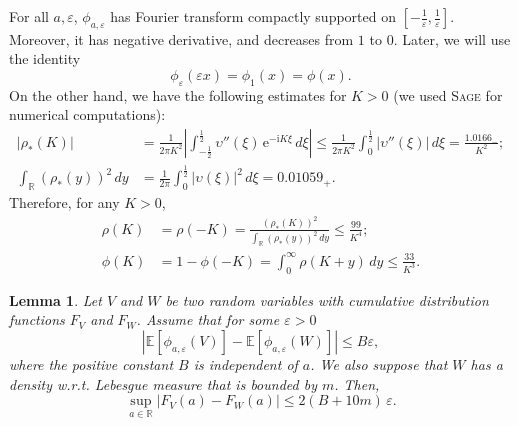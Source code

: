 \documentclass[12pt,a4paper,reqno]{amsart}
\newcommand{\R}{\mathbb{R}}
\newcommand{\E}{\mathrm{e}}
\newcommand{\I}{\mathrm{i}}
\newcommand{\esper}{\mathbb{E}}
\newcommand{\eps}{\varepsilon}
\newtheorem{lemma}[theorem]{Lemma}
\theoremstyle{remark}
\begin{document}
For all $a,\eps$, $\phi_{a,\eps}$ has Fourier transform compactly supported on $\left[-\frac{1}{\eps},\frac{1}{\eps}\right]$. Moreover, it has negative derivative, and decreases from $1$ to $0$. Later, we will use the identity
$$\phi_\eps(\eps x)=\phi_1(x)=\phi(x).$$
On the other hand, we have the following estimates for $K>0$ (we used \textsc{Sage} for numerical computations):
\begin{align*}
 |\rho_*(K)| &= \frac{1}{2\pi K^2}\left|\int_{-\frac{1}{2}}^{\frac{1}{2}} \upsilon''(\xi)\,\E^{-\I K \xi}\, d\xi\right| \leq \frac{1}{2\pi K^2} \int_{0}^{\frac{1}{2}} |\upsilon''(\xi)|\,d\xi = \frac{1.0166_-}{K^2};\\
\int_{\R} (\rho_*(y))^2\,dy&=\frac{1}{2\pi} \int_0^{\frac{1}{2}} |\upsilon(\xi)|^2\,d\xi = 0.01059_+.\end{align*}
Therefore, for any $K>0$,
\begin{align*}
\rho(K) &= \rho(-K)=\frac{(\rho_*(K))^2}{\int_{\R} (\rho_*(y))^2\,dy} \leq \frac{99}{K^4};\\
\phi(K)&=1-\phi(-K)=\int_{0}^\infty \rho(K+y)\,dy \leq \frac{33}{K^3}.
\end{align*}
\medskip

\begin{lemma}\label{lem:tao}
Let $V$ and $W$ be two random variables with cumulative distribution functions $F_V$ and $F_W$. Assume that for some $\eps>0$
$$|\esper[\phi_{a,\eps}(V)]-\esper[\phi_{a,\eps}(W)] | \leq B\eps,$$
where the positive constant $B$ is independent of $a$. We also suppose that $W$ has a density w.r.t. Lebesgue measure that is bounded by $m$. Then, 
$$\sup_{a \in \R} |F_V(a)-F_W(a)| \leq 2(B+10m)\,\eps.$$ 
\end{lemma}
\end{document}
